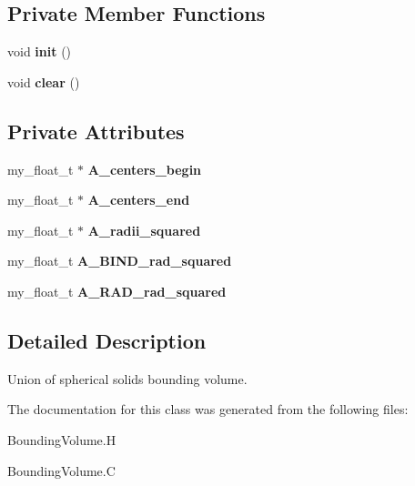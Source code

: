 \subsection*{Private Member Functions}
\begin{CompactItemize}
\item 
void \textbf{init} ()\label{classSimSite3D_1_1UnionOfBalls_a98c168b667d7298c29037933b10b922}

\item 
void \textbf{clear} ()\label{classSimSite3D_1_1UnionOfBalls_e6fcd15076dd64afce01a77027ee1ef9}

\end{CompactItemize}
\subsection*{Private Attributes}
\begin{CompactItemize}
\item 
my\_\-float\_\-t $\ast$ \textbf{A\_\-centers\_\-begin}\label{classSimSite3D_1_1UnionOfBalls_5bc57d328307b5bd8599468bc102c974}

\item 
my\_\-float\_\-t $\ast$ \textbf{A\_\-centers\_\-end}\label{classSimSite3D_1_1UnionOfBalls_45abbdda1436d8cf9a6307475e1f981e}

\item 
my\_\-float\_\-t $\ast$ \textbf{A\_\-radii\_\-squared}\label{classSimSite3D_1_1UnionOfBalls_483337996767271d2a28f3142abed396}

\item 
my\_\-float\_\-t \textbf{A\_\-BIND\_\-rad\_\-squared}\label{classSimSite3D_1_1UnionOfBalls_70cef8b0e9a4fb07652d525127589a33}

\item 
my\_\-float\_\-t \textbf{A\_\-RAD\_\-rad\_\-squared}\label{classSimSite3D_1_1UnionOfBalls_0e1c4804bf021db5e7f641e9316a6226}

\end{CompactItemize}


\subsection{Detailed Description}
Union of spherical solids bounding volume. 



The documentation for this class was generated from the following files:\begin{CompactItemize}
\item 
Bounding\-Volume.H\item 
Bounding\-Volume.C\end{CompactItemize}
